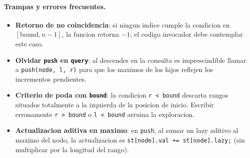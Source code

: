 \paragraph{Trampas y errores frecuentes.}
\begin{itemize}\setlength\itemsep{0pt}
	\item \textbf{Retorno de no coincidencia}: si ningun indice cumple la condicion en $[ \text{bound}, n-1 ]$, la funcion retorna $-1$; el codigo invocador debe contemplar este caso.
	\item \textbf{Olvidar \texttt{push} en \texttt{query}}: al descender en la consulta es imprescindible llamar a \texttt{push(node, l, r)} para que los maximos de los hijos reflejen los incrementos pendientes.
	\item \textbf{Criterio de poda con \texttt{bound}}: la condicion \texttt{r < bound} descarta rangos situados totalmente a la izquierda de la posicion de inicio. Escribir erronamente \texttt{r > bound} o \texttt{l < bound} arruina la exploracion.
	\item \textbf{Actualizacion aditiva en maximo}: en \texttt{push}, al sumar un lazy aditivo al maximo del nodo, la actualizacion es \texttt{st[node].val += st[node].lazy;} (sin multiplicar por la longitud del rango).
\end{itemize}

